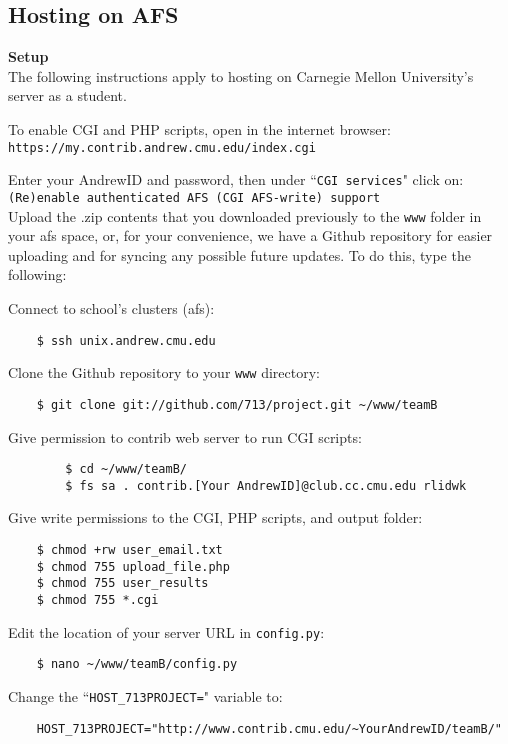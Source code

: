 \documentclass[11pt]{article}
\begin{document}
\subsection{Hosting on AFS}
\textbf{Setup}\\
The following instructions apply to hosting on Carnegie Mellon University's server as a student.

To enable CGI and PHP scripts, open in the internet browser:\\
\texttt{https://my.contrib.andrew.cmu.edu/index.cgi}
\smallskip

Enter your AndrewID and password, then under ``\texttt{CGI services}" click on:\\
\texttt{(Re)enable authenticated AFS (CGI AFS-write) support}\\

Upload the .zip contents that you downloaded previously to the \texttt{www} folder in your afs space, or, for your convenience, we have a Github repository for easier uploading and for syncing any possible future updates. To do this, type the following:
\bigskip

Connect to school's clusters (afs):
	\begin{verbatim}
	$ ssh unix.andrew.cmu.edu
	\end{verbatim}
\bigskip

Clone the Github repository to your \texttt{www} directory:
	\begin{verbatim}
	$ git clone git://github.com/713/project.git ~/www/teamB
	\end{verbatim}
\bigskip

\newpage
Give permission to contrib web server to run CGI scripts:
	\begin{verbatim}
		$ cd ~/www/teamB/
		$ fs sa . contrib.[Your AndrewID]@club.cc.cmu.edu rlidwk
	\end{verbatim}
\bigskip

Give write permissions to the CGI, PHP scripts, and output folder:
	\begin{verbatim}
	$ chmod +rw user_email.txt
	$ chmod 755 upload_file.php
	$ chmod 755 user_results
	$ chmod 755 *.cgi
	\end{verbatim}
\bigskip

Edit the location of your server URL in \texttt{config.py}:
	\begin{verbatim}
	$ nano ~/www/teamB/config.py
	\end{verbatim}
\bigskip

Change the ``\texttt{HOST\_713PROJECT=}" variable to:
	\begin{verbatim}
	HOST_713PROJECT="http://www.contrib.cmu.edu/~YourAndrewID/teamB/"
	\end{verbatim}
\end{document}
